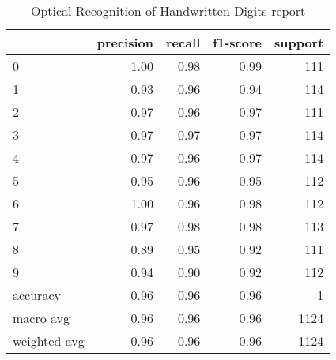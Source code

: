 \begin{table}
\caption{Optical Recognition of Handwritten Digits report}
\begin{tabular}{lrrrr}
\toprule
 & precision & recall & f1-score & support \\
\midrule
0 & 1.00 & 0.98 & 0.99 & 111 \\
1 & 0.93 & 0.96 & 0.94 & 114 \\
2 & 0.97 & 0.96 & 0.97 & 111 \\
3 & 0.97 & 0.97 & 0.97 & 114 \\
4 & 0.97 & 0.96 & 0.97 & 114 \\
5 & 0.95 & 0.96 & 0.95 & 112 \\
6 & 1.00 & 0.96 & 0.98 & 112 \\
7 & 0.97 & 0.98 & 0.98 & 113 \\
8 & 0.89 & 0.95 & 0.92 & 111 \\
9 & 0.94 & 0.90 & 0.92 & 112 \\
accuracy & 0.96 & 0.96 & 0.96 & 1 \\
macro avg & 0.96 & 0.96 & 0.96 & 1124 \\
weighted avg & 0.96 & 0.96 & 0.96 & 1124 \\
\bottomrule
\end{tabular}
\end{table}
